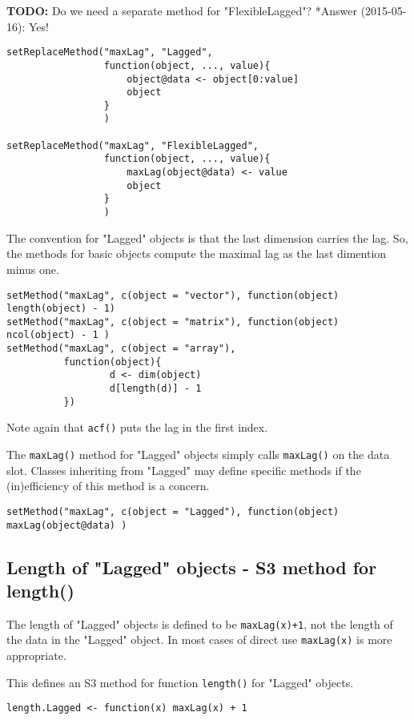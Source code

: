 \documentclass[11pt,a4paper]{article}
\begin{document}
\textbf{TODO:} Do we need a separate method for "FlexibleLagged"?
*Answer (2015-05-16): Yes!
\begin{verbatim}
setReplaceMethod("maxLag", "Lagged",
                 function(object, ..., value){
                     object@data <- object[0:value]
                     object
                 }
                 )

setReplaceMethod("maxLag", "FlexibleLagged",
                 function(object, ..., value){
                     maxLag(object@data) <- value
                     object
                 }
                 )
\end{verbatim}

The convention for "Lagged" objects is that the last dimension carries the lag.  So, the
methods for basic objects compute the maximal lag as the last dimention minus one.
\begin{verbatim}
setMethod("maxLag", c(object = "vector"), function(object) length(object) - 1)
setMethod("maxLag", c(object = "matrix"), function(object) ncol(object) - 1 )
setMethod("maxLag", c(object = "array"),
          function(object){
                  d <- dim(object)
                  d[length(d)] - 1
          })
\end{verbatim}
Note again that \texttt{acf()} puts the lag in the first index.

The \texttt{maxLag()} method for "Lagged" objects simply calls \texttt{maxLag()} on the data slot. Classes
inheriting from "Lagged" may define specific methods if the (in)efficiency of this method is
a concern.
\begin{verbatim}
setMethod("maxLag", c(object = "Lagged"), function(object) maxLag(object@data) )
\end{verbatim}


\subsection{Length of "Lagged" objects - S3 method for length()}
\label{sec:org68a3c70}

The length of "Lagged" objects is defined to be \texttt{maxLag(x)+1}, not the length of the data in
the "Lagged" object. In most cases of direct use \texttt{maxLag(x)} is more appropriate.

This defines an S3 method for function \texttt{length()} for "Lagged" objects.
\begin{verbatim}
length.Lagged <- function(x) maxLag(x) + 1
\end{verbatim}
\end{document}

